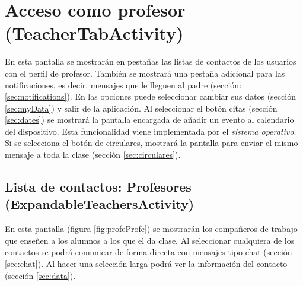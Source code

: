 	\section{Acceso como profesor (TeacherTabActivity)}
	
		En esta pantalla se mostrarán en pestañas las listas de contactos de los usuarios con el perfil de profesor. También se mostrará una pestaña adicional para las notificaciones, es decir, mensajes que le lleguen al padre (sección: \ref{sec:notifications}). En las opciones puede seleccionar cambiar sus datos (sección \ref{sec:myData}) y salir de la aplicación.
		Al seleccionar el botón citas (sección \ref{sec:dates}) se mostrará la pantalla encargada de añadir un evento al calendario del dispositivo. Esta funcionalidad viene implementada por el {\it sistema operativo}. Si se selecciona el botón de circulares, mostrará la pantalla para enviar el mismo mensaje a toda la clase (sección \ref{sec:circulares}).
		
		\subsection{Lista de contactos: Profesores (ExpandableTeachersActivity)}
		
			En esta pantalla (figura \ref{fig:profeProfe}) se mostrarán los compañeros de trabajo que enseñen a los alumnos a los que el da clase. Al seleccionar cualquiera de los contactos se podrá comunicar de forma directa con mensajes tipo chat (sección \ref{sec:chat}). Al hacer una selección larga podrá ver la información del contacto (sección \ref{sec:data}).
			
